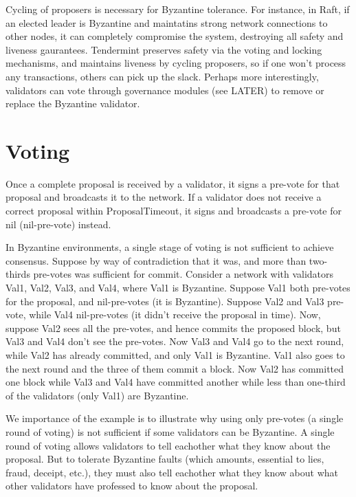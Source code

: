 Cycling of proposers is necessary for Byzantine tolerance. 
For instance, in Raft, if an elected leader is Byzantine and maintatins strong network connections to other nodes,
it can completely compromise the system, destroying all safety and liveness gaurantees.
Tendermint preserves safety via the voting and locking mechanisms, 
and maintains liveness by cycling proposers, so if one won't process any transactions, others can pick up the slack.
Perhaps more interestingly, validators can vote through governance modules (see LATER) to remove or replace the Byzantine validator.

\iffalse
TODO: move the tuning comment 
Upon entering a new round, validators wait ProposalTimeout to receive a complete proposal before broadcasting their pre-vote.
The ProposalTimeout thus serves as a critical paramter for tuning the performance of the system,
as it determines how much latency is permitted from proposers before validators start voting to skip them.
\fi

\section{Voting}

Once a complete proposal is received by a validator, 
it signs a pre-vote for that proposal and broadcasts it to the network.
If a validator does not receive a correct proposal within ProposalTimeout, 
it signs and broadcasts a pre-vote for nil (nil-pre-vote) instead.

In Byzantine environments, a single stage of voting is not sufficient to achieve consensus.
Suppose by way of contradiction that it was, and more than two-thirds pre-votes was sufficient for commit.
Consider a network with validators Val1, Val2, Val3, and Val4, where Val1 is Byzantine.
Suppose Val1 both pre-votes for the proposal, and nil-pre-votes (it is Byzantine).
Suppose Val2 and Val3 pre-vote, while Val4 nil-pre-votes (it didn't receive the proposal in time).
Now, suppose Val2 sees all the pre-votes, and hence commits the proposed block,
but Val3 and Val4 don't see the pre-votes.
Now Val3 and Val4 go to the next round, while Val2 has already committed, and only Val1 is Byzantine.
Val1 also goes to the next round and the three of them commit a block.
Now Val2 has committed one block while Val3 and Val4 have committed another while less than one-third of the validators (only Val1) are Byzantine.

We importance of the example is to illustrate why using only pre-votes (a single round of voting) 
is not sufficient if some validators can be Byzantine.
A single round of voting allows validators to tell eachother what they know about the proposal.	
But to tolerate Byzantine faults (which amounts, essential to lies, fraud, deceipt, etc.), 
they must also tell eachother what they know about what other validators have professed to know about the proposal.

